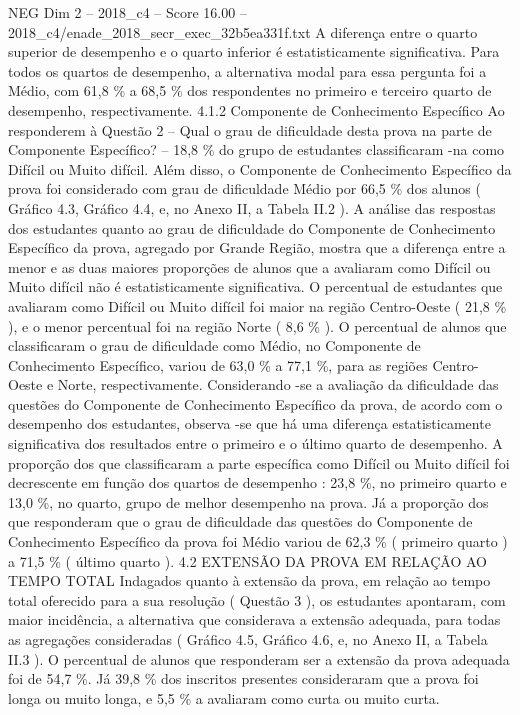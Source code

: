 \begin{textsample}{NEG Dim 2 – 2018\_c4 – Score 16.00 – 2018\_c4/enade\_2018\_secr\_exec\_32b5ea331f.txt}
A diferença entre o quarto superior de desempenho e o quarto inferior é estatisticamente significativa.
Para todos os quartos de desempenho, a alternativa modal para essa pergunta foi a Médio, com 61,8 \% a 68,5 \% dos respondentes no primeiro e terceiro quarto de desempenho, respectivamente. 4.1.2 Componente de Conhecimento Específico Ao responderem à Questão 2 – Qual o grau de dificuldade desta prova na parte de Componente Específico? – 18,8 \% do grupo de estudantes classificaram -na como Difícil ou Muito difícil.
Além disso, o Componente de Conhecimento Específico da prova foi considerado com grau de dificuldade Médio por 66,5 \% dos alunos ( Gráfico 4.3, Gráfico 4.4, e, no Anexo II, a Tabela II.2 ).
A análise das respostas dos estudantes quanto ao grau de dificuldade do Componente de Conhecimento Específico da prova, agregado por Grande Região, mostra que a diferença entre a menor e as duas maiores proporções de alunos que a avaliaram como Difícil ou Muito difícil não é estatisticamente significativa.
O percentual de estudantes que avaliaram como Difícil ou Muito difícil foi maior na região Centro-Oeste ( 21,8 \% ), e o menor percentual foi na região Norte ( 8,6 \% ).
O percentual de alunos que classificaram o grau de dificuldade como Médio, no Componente de Conhecimento Específico, variou de 63,0 \% a 77,1 \%, para as regiões Centro-Oeste e Norte, respectivamente.
Considerando -se a avaliação da dificuldade das questões do Componente de Conhecimento Específico da prova, de acordo com o desempenho dos estudantes, observa -se que há uma diferença estatisticamente significativa dos resultados entre o primeiro e o último quarto de desempenho.
A proporção dos que classificaram a parte específica como Difícil ou Muito difícil foi decrescente em função dos quartos de desempenho : 23,8 \%, no primeiro quarto e 13,0 \%, no quarto, grupo de melhor desempenho na prova.
Já a proporção dos que responderam que o grau de dificuldade das questões do Componente de Conhecimento Específico da prova foi Médio variou de 62,3 \% ( primeiro quarto ) a 71,5 \% ( último quarto ). 4.2 EXTENSÃO DA PROVA EM RELAÇÃO AO TEMPO TOTAL Indagados quanto à extensão da prova, em relação ao tempo total oferecido para a sua resolução ( Questão 3 ), os estudantes apontaram, com maior incidência, a alternativa que considerava a extensão adequada, para todas as agregações consideradas ( Gráfico 4.5, Gráfico 4.6, e, no Anexo II, a Tabela II.3 ).
O percentual de alunos que responderam ser a extensão da prova adequada foi de 54,7 \%.
Já 39,8 \% dos inscritos presentes consideraram que a prova foi longa ou muito longa, e 5,5 \% a avaliaram como curta ou muito curta.

\end{textsample}
